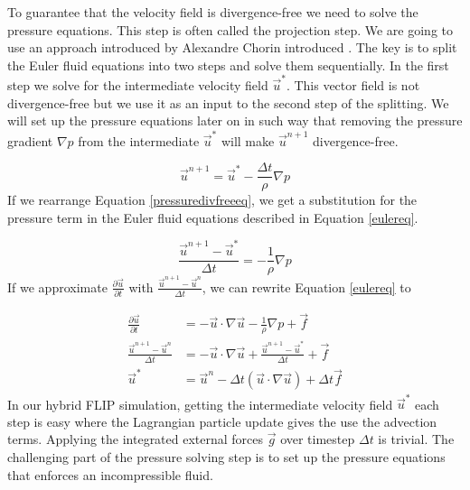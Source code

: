 To guarantee that the velocity field is divergence-free we need to solve the pressure equations. This step is often called the projection step. We are going to use an approach introduced by Alexandre Chorin introduced \cite{chorin}. The key is to split the Euler fluid equations into two steps and solve them sequentially. In the first step we solve for the intermediate velocity field $\vec{u}^*$. This vector field is not divergence-free but we use it as an input to the second step of the splitting. We will set up the pressure equations later on in such way that removing the pressure gradient $\nabla p$ from the intermediate $\vec{u}^*$ will make $\vec{u}^{n+1}$ divergence-free.

\begin{equation}
\vec{u}^{n+1} = \vec{u}^* - \frac{\Delta t}{\rho} \nabla p
\label{pressuredivfreeeq}
\end{equation}
\noindent
If we rearrange Equation \ref{pressuredivfreeeq}, we get a substitution for the pressure term in the Euler fluid equations described in Equation \ref{eulereq}.

\begin{equation}
\frac{\vec{u}^{n+1} - \vec{u}^*}{\Delta t}= - \frac{1}{\rho} \nabla p
\label{pressuredivfreeeqsub}
\end{equation}
\noindent
If we approximate $\frac{\partial \vec{u}}{\partial t}$ with $\frac{\vec{u}^{n+1} - \vec{u}^{n}}{\Delta t}$, we can rewrite Equation \ref {eulereq} to

\begin{equation}
\begin{split}
\frac{\partial \vec{u}}{\partial t}  &= -\vec{u} \cdot \nabla \vec{u} - \frac{1}{\rho}\nabla p + \vec{f}\\
\frac{\vec{u}^{n+1} - \vec{u}^{n}}{\Delta t}  &= - \vec{u} \cdot \nabla \vec{u} + \frac{\vec{u}^{n+1} - \vec{u}^*}{\Delta t} + \vec{f} \\
\vec{u}^* & = \vec{u}^n - \Delta t(\vec{u} \cdot \nabla \vec{u}) + \Delta t\vec{f}
\end{split}
\end{equation}
\noindent
In our hybrid FLIP simulation, getting the intermediate velocity field  $\vec{u}^*$ each step is easy where the Lagrangian particle update gives the use the advection terms. Applying the integrated external forces $\vec{g}$ over timestep $\Delta t$ is trivial. The challenging part of the pressure solving step is to set up the pressure equations that enforces an incompressible fluid.
